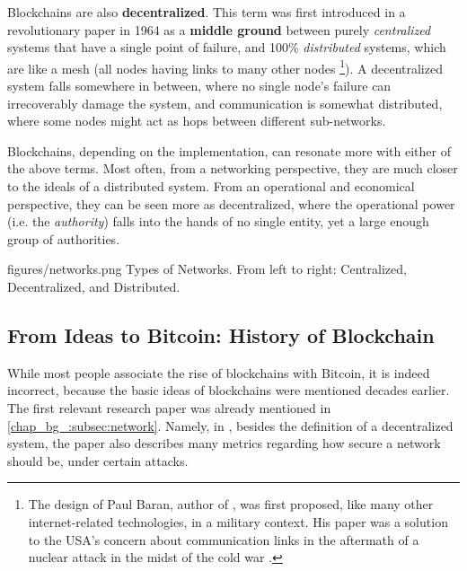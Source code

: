 
Blockchains are also \textbf{decentralized}. This term was first introduced in a revolutionary paper
in 1964 as a \textbf{middle ground} between purely \textit{centralized} systems that have a single
point of failure, and 100\% \textit{distributed} systems, which are like a mesh (all nodes having
links to many other nodes \cite{baranDistributedCommunicationsNetworks1964} \footnote{The design of
Paul Baran, author of \cite{baranDistributedCommunicationsNetworks1964}, was first proposed, like
many other internet-related technologies, in a military context. His paper was a solution to the
USA's concern about communication links in the aftermath of a nuclear attack in the midst of the
cold war \cite{monicaPaulBaranOrigins}.}). A decentralized system falls somewhere in between, where
no single node's failure can irrecoverably damage the system, and communication is somewhat
distributed, where some nodes might act as hops between different sub-networks.

Blockchains, depending on the implementation, can resonate more with either of the above terms. Most
often, from a networking perspective, they are much closer to the ideals of a distributed system.
From an operational and economical perspective, they can be seen more as decentralized, where the
operational power (i.e. the \textit{authority}) falls into the hands of no single entity, yet a
large enough group of authorities.

\figuremacro
	{figures/networks.png} {Types of Networks.} {From left to right: Centralized, Decentralized, and
	Distributed.}

\subsection{From Ideas to Bitcoin: History of Blockchain} \label{chap_bg_:subsec:hisotry}

While most people associate the rise of blockchains with Bitcoin, it is indeed incorrect, because
the basic ideas of blockchains were mentioned decades earlier. The first relevant research paper was
already mentioned in \ref{chap_bg_:subsec:network}. Namely, in
\cite{baranDistributedCommunicationsNetworks1964}, besides the definition of a decentralized system,
the paper also describes many metrics regarding how secure a network should be, under certain
attacks.

